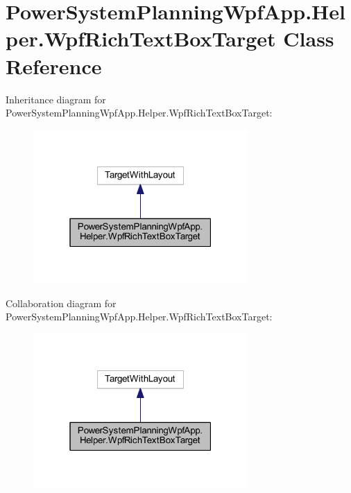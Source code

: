 \hypertarget{class_power_system_planning_wpf_app_1_1_helper_1_1_wpf_rich_text_box_target}{}\section{Power\+System\+Planning\+Wpf\+App.\+Helper.\+Wpf\+Rich\+Text\+Box\+Target Class Reference}
\label{class_power_system_planning_wpf_app_1_1_helper_1_1_wpf_rich_text_box_target}


Inheritance diagram for Power\+System\+Planning\+Wpf\+App.\+Helper.\+Wpf\+Rich\+Text\+Box\+Target\+:\nopagebreak
\begin{figure}[H]
\begin{center}
\leavevmode
\includegraphics[width=232pt]{class_power_system_planning_wpf_app_1_1_helper_1_1_wpf_rich_text_box_target__inherit__graph}
\end{center}
\end{figure}


Collaboration diagram for Power\+System\+Planning\+Wpf\+App.\+Helper.\+Wpf\+Rich\+Text\+Box\+Target\+:\nopagebreak
\begin{figure}[H]
\begin{center}
\leavevmode
\includegraphics[width=232pt]{class_power_system_planning_wpf_app_1_1_helper_1_1_wpf_rich_text_box_target__coll__graph}
\end{center}
\end{figure}
